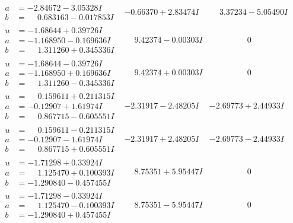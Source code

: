 \documentclass[1p]{elsarticle_modified}
\theoremstyle{definition}
\begin{document}
$$\begin{array}{c|c|c}
\begin{aligned}
a &= -2.84672 - 3.05328 I \\
b &= \phantom{-}0.683163 - 0.017853 I\end{aligned}
 & -0.66370 + 2.83474 I & \phantom{-}3.37234 - 5.05490 I \\ \hline\begin{aligned}
u &= -1.68644 + 0.39726 I \\
a &= -1.168950 - 0.169636 I \\
b &= \phantom{-}1.311260 + 0.345336 I\end{aligned}
 & \phantom{-}9.42374 - 0.00303 I & \phantom{-0.000000 } 0 \\ \hline\begin{aligned}
u &= -1.68644 - 0.39726 I \\
a &= -1.168950 + 0.169636 I \\
b &= \phantom{-}1.311260 - 0.345336 I\end{aligned}
 & \phantom{-}9.42374 + 0.00303 I & \phantom{-0.000000 } 0 \\ \hline\begin{aligned}
u &= \phantom{-}0.159611 + 0.211315 I \\
a &= -0.12907 + 1.61974 I \\
b &= \phantom{-}0.867715 - 0.605551 I\end{aligned}
 & -2.31917 - 2.48205 I & -2.69773 + 2.44933 I \\ \hline\begin{aligned}
u &= \phantom{-}0.159611 - 0.211315 I \\
a &= -0.12907 - 1.61974 I \\
b &= \phantom{-}0.867715 + 0.605551 I\end{aligned}
 & -2.31917 + 2.48205 I & -2.69773 - 2.44933 I \\ \hline\begin{aligned}
u &= -1.71298 + 0.33924 I \\
a &= \phantom{-}1.125470 + 0.100393 I \\
b &= -1.290840 - 0.457455 I\end{aligned}
 & \phantom{-}8.75351 + 5.95447 I & \phantom{-0.000000 } 0 \\ \hline\begin{aligned}
u &= -1.71298 - 0.33924 I \\
a &= \phantom{-}1.125470 - 0.100393 I \\
b &= -1.290840 + 0.457455 I\end{aligned}
 & \phantom{-}8.75351 - 5.95447 I & \phantom{-0.000000 } 0 \\ \hline\begin{aligned}

\end{aligned}
\end{array}$$
\end{document}
